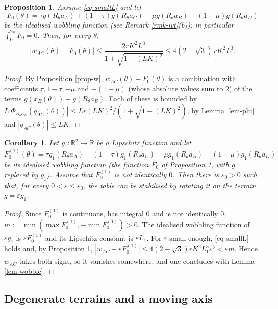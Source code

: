 \documentclass[a4paper,11pt,twoside,leqno]{article}
\newtheorem{prop}[teo]{Proposition}
\newtheorem{cor}[teo]{Corollary}
\newcommand{\eps}[0]{\varepsilon}
\newcommand{\rr}[0]{\ensuremath{\mathbb{R}}}
\numberwithin{equation}{section}
\begin{document}
\begin{prop}\label{prop-error}
Assume \eqref{eq-smallL} and let
\[
F_0(\theta) = \tau g(R_\theta a_A) + (1-\tau) g(R_\theta a_C) - \mu g(R_\theta a_B) - (1-\mu) g(R_\theta a_D)
\]
be the idealised wobbling function (see Remark \ref{rmk-ivt}(b)); in particular $\int_0^{2\pi} F_0 = 0$. Then, for every $\theta$,
\[
|w_{AC}(\theta) - F_0(\theta)| \leq \frac{2 r K^2 L^3}{1 + \sqrt{1-(LK)^2}} \leq 4(2-\sqrt{3})\, r K^2 L^3.
\]
\end{prop}
\begin{proof}
By Proposition \ref{prop-w}, $w_{AC}(\theta) - F_0(\theta)$ is a combination with coefficients $\tau, 1-\tau, -\mu$ and $-(1-\mu)$ (whose absolute values sum to $2$) of the terms $g(x_E(\theta)) - g(R_\theta a_E)$. Each of these is bounded by $L|\Phi_{R_\theta a_E}(q_{AC}(\theta))| \leq L r (LK)^2 / (1+\sqrt{1-(LK)^2})$, by Lemma \ref{lem-phi} and $|q_{AC}(\theta)| \leq LK$.
\end{proof}

\begin{cor}\label{cor-small}
Let $g_1: \rr^2 \to \rr$ be a Lipschitz function and let
\[
F_0^{(1)}(\theta) = \tau g_1(R_\theta a_A) + (1-\tau) g_1(R_\theta a_C) - \mu g_1(R_\theta a_B) - (1-\mu) g_1(R_\theta a_D)
\]
be its idealised wobbling function (the function $F_0$ of Proposition \ref{prop-error}, with $g$ replaced by $g_1$). Assume that $F_0^{(1)}$ is not identically $0$. Then there is $\eps_0 >0$ such that, for every $0 < \eps \leq \eps_0$, the table can be stabilised by rotating it on the terrain $g = \eps g_1$.
\end{cor}
\begin{proof}
Since $F^{(1)}_0$ is continuous, has integral $0$ and is not identically $0$, \linebreak $m := \min(\max F^{(1)}_0, -\min F^{(1)}_0) >0$. The idealised wobbling function of $\eps g_1$ is $\eps F_0^{(1)}$ and its Lipschitz constant is $\eps L_1$. For $\eps$ small enough, \eqref{eq-smallL} holds and, by Proposition \ref{prop-error}, $|w_{AC} - \eps F_0^{(1)}| \leq 4(2-\sqrt{3}) r K^2 L_1^3 \eps^3 < \eps m$. Hence $w_{AC}$ takes both signs, so it vanishes somewhere, and one concludes with Lemma \ref{lem-wobble}.
\end{proof}

\subsection{Degenerate terrains and a moving axis}\label{ss-remains}
\end{document}
